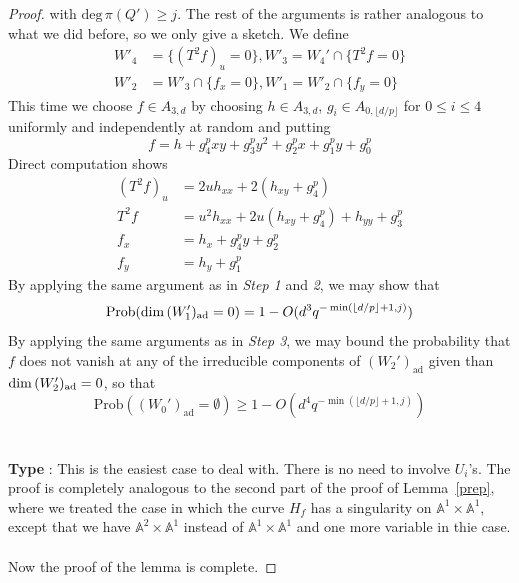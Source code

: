 \documentclass[12pt]{article}
\theoremstyle{plain}
\theoremstyle{definition}
\newcommand{\IA}{\mathbb{A}}
\renewcommand{\deg}{\mathrm{deg}\,}
\renewcommand\dim{{\rm dim\,}}
\newcommand{\<}{\langle}
\renewcommand{\>}{\rangle}
\newcommand{\Prob}{\mathrm{Prob}}
\newcommand{\ad}{\mathrm{ad}}
\newcommand{\yk}{\lfloor d/p \rfloor}
\begin{document}
\begin{proof}
with $\deg \pi(Q') \ge j$. 
The rest of the arguments is rather analogous to what we did before, so we only give a sketch. We define 
\begin{align*}
W'_4 &= \{ (T^2 f)_u = 0 \}, W'_3 = W_4' \cap \{ T^2 f = 0 \} \\
W'_2 &= W'_3 \cap \{ f_x = 0 \}, W'_1 = W'_2 \cap \{ f_y = 0 \}
\end{align*}
This time we choose $f \in A_{3, d}$ by choosing $h \in A_{3, d}$, $g_i \in A_{0, \yk}$ for $0 \le i \le 4$ uniformly and independently at random and putting 
$$ f = h + g_4^p xy + g_3^p y^2 + g_2^p x + g_1^p y + g_0^p $$
Direct computation shows 
\begin{align*}
(T^2 f )_u &= 2u h_{xx} + 2(h_{xy} + g_4^p) \\
T^2 f &= u^2 h_{xx} + 2 u (h_{xy} + g_4^p) + h_{yy} + g_3^p \\
f_x &= h_x + g_4^p y + g_2^p \\
f_y &= h_y + g_1^p 
\end{align*}
By applying the same argument as in \textit{Step 1} and \textit{2}, we may show that 
$$ \Prob(\dim(W'_1)_\ad = 0) = 1 - O(d^3 q^{- \min(\yk + 1, j)}) $$
By applying the same arguments as in \textit{Step 3}, we may bound the probability that $f$ does not vanish at any of the irreducible components of $(W_2')_\ad$ given than $\dim (W'_2)_\ad = 0$, so that 
$$ \Prob((W_0')_\ad = \emptyset) \ge 1 - O(d^4 q^{- \min(\yk + 1, j)}) $$\\\\
\textbf{Type \uppercase\expandafter{}}: This is the easiest case to deal with. There is no need to involve $U_i$'s. The proof is completely analogous to the second part of the proof of Lemma~\ref{prep}, where we treated the case in which the curve $H_f$ has a singularity on $\IA^1 \times \IA^1$, except that we have $\IA^2 \times \IA^1$ instead of $\IA^1 \times \IA^1$ and one more variable in thie case. \\\\ 
Now the proof of the lemma is complete. 
\end{proof}
\end{document}
